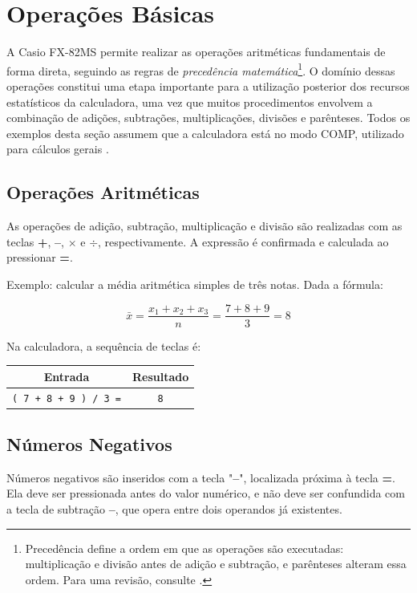 \chapter{Operações Básicas}

A Casio FX-82MS permite realizar as operações aritméticas fundamentais de forma direta, seguindo as regras de \textit{precedência matemática}\footnote{Precedência define a ordem em que as operações são executadas: multiplicação e divisão antes de adição e subtração, e parênteses alteram essa ordem. Para uma revisão, consulte \cite{lima2006}.}. O domínio dessas operações constitui uma etapa importante para a utilização posterior dos recursos estatísticos da calculadora, uma vez que muitos procedimentos envolvem a combinação de adições, subtrações, multiplicações, divisões e parênteses. Todos os exemplos desta seção assumem que a calculadora está no modo COMP, utilizado para cálculos gerais \cite{casio2004}.

\section{Operações Aritméticas}

As operações de adição, subtração, multiplicação e divisão são realizadas com as teclas \textbf{+}, \textbf{--}, \textbf{$\times$} e \textbf{$\div$}, respectivamente. A expressão é confirmada e calculada ao pressionar \textbf{=}.

Exemplo: calcular a média aritmética simples de três notas. Dada a fórmula:

\[
    \bar{x} = \frac{x_1 + x_2 + x_3}{n} = \frac{7 + 8 + 9}{3} = 8
\]

Na calculadora, a sequência de teclas é:

\begin{center}
\begin{tabular}{|c|c|}
    \hline
    \textbf{Entrada} & \textbf{Resultado} \\
    \hline
    \texttt{( 7 + 8 + 9 ) / 3 =} & \texttt{8} \\
    \hline
\end{tabular}
\end{center}

\section{Números Negativos}

Números negativos são inseridos com a tecla "\textbf{--}", localizada próxima à tecla \textbf{=}. Ela deve ser pressionada antes do valor numérico, e não deve ser confundida com a tecla de subtração \textbf{--}, que opera entre dois operandos já existentes.

